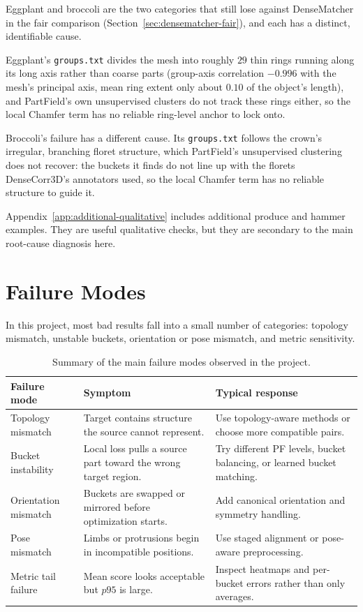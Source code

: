 \documentclass{article}
\begin{document}
Eggplant and broccoli are the two categories that still lose against DenseMatcher in the fair
comparison (Section~\ref{sec:densematcher-fair}), and each has a distinct, identifiable cause.

Eggplant's \texttt{groups.txt} divides the mesh into roughly $29$ thin rings running along its long
axis rather than coarse parts (group-axis correlation $-0.996$ with the mesh's principal axis, mean
ring extent only about $0.10$ of the object's length), and PartField's own unsupervised clusters do
not track these rings either, so the local Chamfer term has no reliable ring-level anchor to lock
onto.

Broccoli's failure has a different cause. Its \texttt{groups.txt} follows the crown's irregular,
branching floret structure, which PartField's unsupervised clustering does not recover: the buckets
it finds do not line up with the florets DenseCorr3D's annotators used, so the local Chamfer term
has no reliable structure to guide it.

Appendix~\ref{app:additional-qualitative} includes additional produce and hammer examples. They are
useful qualitative checks, but they are secondary to the main root-cause diagnosis here.

\section{Failure Modes}
\label{sec:failure-modes}

In this project, most bad results fall into a small number of categories: topology mismatch,
unstable buckets, orientation or pose mismatch, and metric sensitivity.

\begin{table}[H]
\centering
\small
\begin{tabularx}{\textwidth}{lXX}
\toprule
Failure mode & Symptom & Typical response \\
\midrule
Topology mismatch & Target contains structure the source cannot represent. & Use topology-aware methods or choose more compatible pairs. \\
Bucket instability & Local loss pulls a source part toward the wrong target region. & Try different PF levels, bucket balancing, or learned bucket matching. \\
Orientation mismatch & Buckets are swapped or mirrored before optimization starts. & Add canonical orientation and symmetry handling. \\
Pose mismatch & Limbs or protrusions begin in incompatible positions. & Use staged alignment or pose-aware preprocessing. \\
Metric tail failure & Mean score looks acceptable but $p95$ is large. & Inspect heatmaps and per-bucket errors rather than only averages. \\
\bottomrule
\end{tabularx}
\caption{Summary of the main failure modes observed in the project.}
\label{tab:failure-summary}
\end{table}
\end{document}
